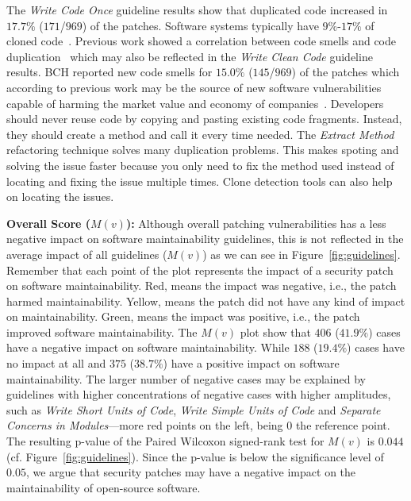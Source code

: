 \documentclass[smallextended]{svjour3}       %
\begin{document}
The \emph{Write Code Once} guideline results show that duplicated 
code increased in $17.7\%$ ($171$/$969$) of the patches. Software systems 
typically have $9\%$-$17\%$ of cloned code~\cite{5773403}. Previous 
work showed a correlation between code smells and code
duplication~\cite{7476787} which may also be reflected in the 
\emph{Write Clean Code} guideline results. BCH reported new code 
smells for $15.0\%$ ($145$/$969$) of the patches which according to previous work 
may be the source of new software vulnerabilities~\cite{8819456,10.1145/3133956.3134072}
capable of harming the market value and economy of companies~\cite{4267025}.
Developers should never reuse code by copying and pasting 
existing code fragments. Instead, they should create a method and call 
it every time needed. The \emph{Extract Method} refactoring 
technique solves many duplication problems. This makes spoting and 
solving the issue faster because you only need to fix the method used
instead of locating and fixing the issue multiple times.
Clone detection tools can also help on locating the issues.

\textbf{Overall Score ($M(v)$):} 
Although overall patching vulnerabilities has a less negative impact
on software maintainability guidelines, this is not reflected in the 
average impact of all guidelines ($M(v)$) as we can see in 
Figure~\ref{fig:guidelines}. Remember that each point of the plot 
represents the impact of a security patch on software 
maintainability. Red, means the impact was negative, i.e., the patch 
harmed maintainability. Yellow, means the patch did not have any 
kind of impact on maintainability. Green, means the impact was 
positive, i.e., the patch improved software maintainability.
The $M(v)$ plot show that $406$ ($41.9\%$) cases have a negative 
impact on software maintainability. While $188$ ($19.4\%$) cases 
have no impact at all and $375$ ($38.7\%$) have a positive impact on 
software maintainability. The larger number of negative cases may be 
explained by guidelines with higher concentrations of negative 
cases with higher amplitudes, such as \emph{Write Short Units of 
Code}, \emph{Write Simple Units of Code} and \emph{Separate Concerns 
in Modules}---more red points on the left, being $0$ the reference point.
The resulting p-value of the Paired Wilcoxon signed-rank test for $M(v)$ 
is $0.044$ (cf. Figure~\ref{fig:guidelines}). Since the p-value is 
below the significance level of $0.05$, we argue that security patches 
may have a negative impact on the maintainability of open-source software.
\end{document}

